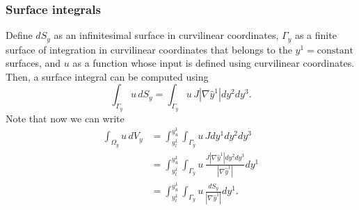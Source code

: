 \documentclass[11pt]{article}
\begin{document}
\subsubsection{Surface integrals}
Define $d S_y$ as an infinitesimal surface in curvilinear coordinates, $\Gamma_y$ as a finite surface of integration in curvilinear coordinates that belongs to the $y^1 = \text{constant}$ surfaces, and $u$ as a function whose input is defined using curvilinear coordinates. Then, a surface integral can be computed using 
\begin{equation}
    \int_{\Gamma_y} u \, d S_y = \int_{\Gamma_y} u \, J | \nabla \hat{y}^1| dy^2 dy^3.
\end{equation}
Note that now we can write
\begin{align}
\label{eq:int_from_vol_surf}
    \int_{\Omega_y} u \,dV_y &= \int_{y^1_l}^{y^1_u} \int_{\Gamma_y} u \, J dy^1 dy^2 dy^3 \nonumber \\
    &= \int_{y^1_l}^{y^1_u} \int_{\Gamma_y} u \, \frac{J | \nabla \hat{y}^1| dy^2 dy^3}{| \nabla \hat{y}^1 |} dy^1 \nonumber \\
    &= \int_{y^1_l}^{y^1_u} \int_{\Gamma_y} u \, \frac{dS_y}{|\nabla \hat{y}^1|} dy^1.
\end{align}

\end{document}

